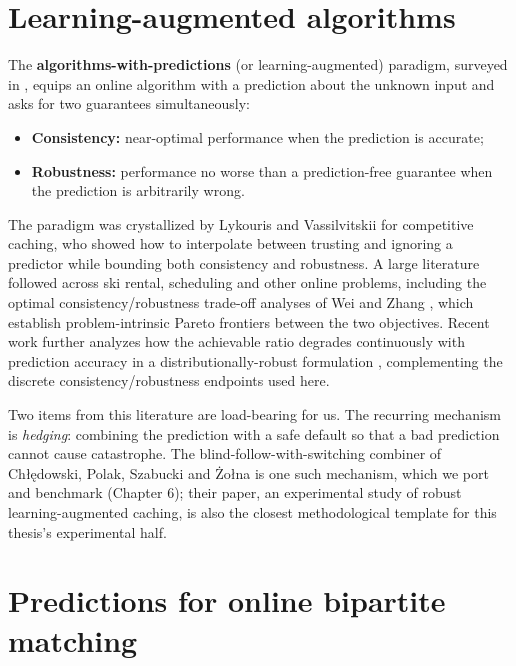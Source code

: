 \section{Learning-augmented
algorithms}

The \textbf{algorithms-with-predictions} (or learning-augmented)
paradigm, surveyed in \autocite{mitzenmacher2020algorithms}, equips an
online algorithm with a prediction about the unknown input and asks for
two guarantees simultaneously:

\begin{itemize}
\tightlist
\item
  \textbf{Consistency:} near-optimal performance when the prediction is
  accurate;
\item
  \textbf{Robustness:} performance no worse than a prediction-free
  guarantee when the prediction is arbitrarily wrong.
\end{itemize}

The paradigm was crystallized by Lykouris and Vassilvitskii
\autocite{lykouris2018caching} for competitive caching, who showed how
to interpolate between trusting and ignoring a predictor while bounding
both consistency and robustness. A large literature followed across ski
rental, scheduling and other online problems, including the optimal
consistency/robustness trade-off analyses of Wei and Zhang
\autocite{weizhang2020tradeoffs}, which establish problem-intrinsic
Pareto frontiers between the two objectives. Recent work further
analyzes how the achievable ratio degrades continuously with prediction
accuracy in a distributionally-robust formulation
\autocite{yoshinaga2026accuracy}, complementing the discrete
consistency/robustness endpoints used here.

Two items from this literature are load-bearing for us. The recurring
mechanism is \emph{hedging}: combining the prediction with a safe
default so that a bad prediction cannot cause catastrophe. The
blind-follow-with-switching combiner of Chłędowski, Polak, Szabucki and
Żołna \autocite{chledowski2021caching} is one such mechanism, which we
port and benchmark (Chapter 6); their paper, an experimental study of
robust learning-augmented caching, is also the closest methodological
template for this thesis's experimental half.

\section{Predictions for online bipartite
matching}

